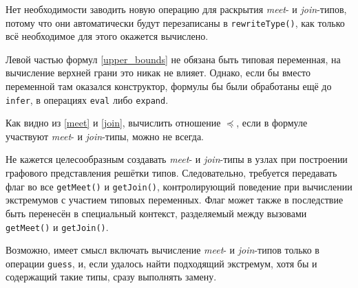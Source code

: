 \documentclass[10pt,russian]{article}
\newcommand{\subtype}{\preccurlyeq}
\begin{document}
Нет необходимости заводить новую операцию для раскрытия \textit{meet}- и
\textit{join}-типов, потому что они автоматически будут перезаписаны в
\texttt{rewriteType()}, как только всё необходимое для этого окажется вычислено.

\vspace{1em}

Левой частью формул \eqref{upper_bounds} не обязана быть типовая переменная, на
вычисление верхней грани это никак не влияет. Однако, если бы вместо
переменной там оказался конструктор, формулы бы были обработаны ещё до
\texttt{infer}, в операциях \texttt{eval} либо \texttt{expand}.

\vspace{1em}

Как видно из \eqref{meet} и \eqref{join}, вычислить отношение $\subtype$, если
в формуле участвуют \textit{meet}- и \textit{join}-типы, можно не всегда.

\vspace{1em}

Не кажется целесообразным создавать \textit{meet}- и \textit{join}-типы в узлах
при построении графового представления решётки типов. Следовательно, требуется
передавать флаг во все \texttt{getMeet()} и \texttt{getJoin()}, контролирующий
поведение при вычислении экстремумов с участием типовых переменных. Флаг может
также в последствие быть перенесён в специальный контекст, разделяемый между
вызовами \texttt{getMeet()} и \texttt{getJoin()}.

\vspace{1em}

Возможно, имеет смысл включать вычисление \textit{meet}- и \textit{join}-типов
только в операции \texttt{guess}, и, если удалось найти подходящий экстремум,
хотя бы и содержащий такие типы, сразу выполнять замену.
\end{document}
